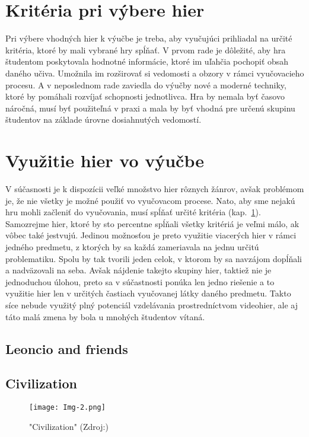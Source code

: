 \documentclass[10pt,twoside,slovak,a4paper]{article}
\begin{document}
\section{Kritéria pri výbere hier} \label{kriteria}

Pri výbere vhodných hier k výučbe je treba, aby vyučujúci prihliadal na určité kritéria, ktoré by mali vybrané hry spĺňať. V prvom rade je dôležité, aby hra študentom poskytovala hodnotné informácie, ktoré im uľahčia pochopiť obsah daného učiva. Umožnila im rozširovať si vedomosti a obzory v rámci vyučovacieho procesu. A v neposlednom rade zaviedla do výučby nové a moderné techniky, ktoré by pomáhali rozvíjať schopnosti jednotlivca. Hra by nemala byť časovo náročná, musí byť použiteľná v praxi a mala by byť vhodná pre určenú skupinu študentov na základe úrovne dosiahnutých vedomostí.

\section{Využitie hier vo výučbe} \label{vyuzitie}

V súčasnosti je k dispozícii veľké množstvo hier rôznych žánrov, avšak problémom je, že nie všetky je možné použiť vo vyučovacom procese. Nato, aby sme nejakú hru mohli začleniť do vyučovania, musí spĺňať určité kritéria (kap.~\ref{kriteria}). Samozrejme hier, ktoré by sto percentne spĺňali všetky kritériá je veľmi málo, ak vôbec také jestvujú. Jedinou možnosťou je preto využitie viacerých hier v rámci jedného predmetu, z ktorých by sa každá zameriavala na jednu určitú problematiku. Spolu by tak tvorili jeden celok, v ktorom by sa navzájom dopĺňali a nadväzovali na seba. Avšak nájdenie takejto skupiny hier, taktiež nie je jednoduchou úlohou, preto sa v súčastnosti ponúka len jedno riešenie a to využitie hier len v určitých častiach vyučovanej látky daného predmetu. Takto síce nebude využitý plný potenciál vzdelávania prostredníctvom videohier, ale aj táto malá zmena by bola u mnohých študentov vítaná. 

\subsection{Leoncio and friends} \label{hra-1}


\subsection{Civilization} \label{hra-2}

\begin{figure}[tbh]
	\centering
	\texttt{[image: Img-2.png]}
	\caption{"Civilization" (Zdroj:\cite{Img-Civil})}
	\label{obr-2}
\end{figure}
\end{document}
